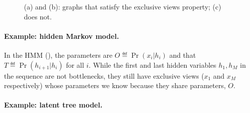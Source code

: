 \begin{figure}
  \centering
  \caption{(a) and (b): graphs that satisfy the exclusive views property; (c) does not.}
  \label{fig:examples}
\end{figure}


\paragraph{Example: hidden Markov model.}

In the HMM (), the parameters
are $O \eqdef \Pr(x_i|h_i)$  and that $T \eqdef \Pr(h_{i+1} | h_i)$
for all $i$. %
While the first and last hidden variables $h_1, h_M$ in the
  sequence are not bottlenecks, they still have exclusive views ($x_1$ and
  $x_M$ respectively) whose parameters we know because they share
  parameters, $O$.

\paragraph{Example: latent tree model.}

